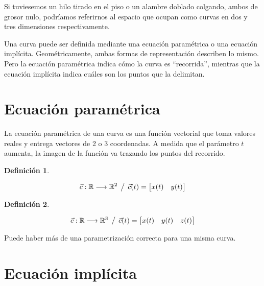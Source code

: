 \documentclass[a5paper,12pt,twoside]{book}
\newtheorem{defn}{{Definición}}[chapter]
\begin{document}
Si tuviesemos un hilo tirado en el piso o un alambre doblado colgando, ambos de grosor nulo, podríamos referirnos al espacio que ocupan como curvas en dos y tres dimensiones respectivamente.

Una curva puede ser definida mediante una ecuación paramétrica o una ecuación implícita. Geométricamente, ambas formas de representación describen lo mismo. Pero la ecuación paramétrica indica cómo la curva es ``recorrida'', mientras que la ecuación implícita indica cuáles son los puntos que la delimitan.


\section{Ecuación paramétrica}

La ecuación paramétrica de una curva es una función vectorial que toma valores reales y entrega vectores de 2 o 3 coordenadas. A medida que el parámetro $t$ aumenta, la imagen de la función va trazando los puntos del recorrido.

\begin{mdframed}[style=MyFrame1]
    \begin{defn}
    \end{defn}
    \begin{equation*}
        \Vec{c}: \mathbb{R} \longrightarrow \mathbb{R}^2 \hspace{1ex} \big/ \hspace{1ex} \Vec{c}(t) = \begin{bmatrix} x(t) & y(t) \end{bmatrix}
    \end{equation*}
\end{mdframed}

\begin{mdframed}[style=MyFrame1]
    \begin{defn}
    \end{defn}
    \begin{equation*}
        \Vec{c}: \mathbb{R} \longrightarrow \mathbb{R}^3 \hspace{1ex} \big/ \hspace{1ex} \Vec{c}(t) = \begin{bmatrix} x(t) & y(t) & z(t) \end{bmatrix}
    \end{equation*}
\end{mdframed}

Puede haber más de una parametrización correcta para una misma curva.


\section{Ecuación implícita}
\end{document}

